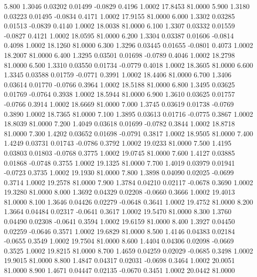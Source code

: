    5.800   1.3046   0.03202   0.01499  -0.0829   0.4196   1.0002  17.8453  81.0000
   5.900   1.3180   0.03223   0.01495  -0.0834   0.4171   1.0002  17.9155  81.0000
   6.000   1.3302   0.03285   0.01513  -0.0839   0.4140   1.0002  18.0038  81.0000
   6.100   1.3307   0.03332   0.01559  -0.0827   0.4121   1.0002  18.0595  81.0000
   6.200   1.3304   0.03387   0.01606  -0.0814   0.4098   1.0002  18.1260  81.0000
   6.300   1.3296   0.03445   0.01655  -0.0801   0.4073   1.0002  18.2007  81.0000
   6.400   1.3295   0.03501   0.01698  -0.0789   0.4046   1.0002  18.2798  81.0000
   6.500   1.3310   0.03550   0.01734  -0.0779   0.4018   1.0002  18.3605  81.0000
   6.600   1.3345   0.03588   0.01759  -0.0771   0.3991   1.0002  18.4406  81.0000
   6.700   1.3406   0.03614   0.01770  -0.0766   0.3964   1.0002  18.5188  81.0000
   6.800   1.3495   0.03625   0.01769  -0.0764   0.3938   1.0002  18.5944  81.0000
   6.900   1.3610   0.03625   0.01757  -0.0766   0.3914   1.0002  18.6669  81.0000
   7.000   1.3745   0.03619   0.01738  -0.0769   0.3890   1.0002  18.7365  81.0000
   7.100   1.3895   0.03613   0.01716  -0.0775   0.3867   1.0002  18.8039  81.0000
   7.200   1.4049   0.03618   0.01699  -0.0782   0.3844   1.0002  18.8718  81.0000
   7.300   1.4202   0.03652   0.01698  -0.0791   0.3817   1.0002  18.9505  81.0000
   7.400   1.4249   0.03731   0.01743  -0.0786   0.3792   1.0002  19.0233  81.0000
   7.500   1.4195   0.03803   0.01803  -0.0768   0.3775   1.0002  19.0745  81.0000
   7.600   1.4127   0.03885   0.01868  -0.0748   0.3755   1.0002  19.1325  81.0000
   7.700   1.4019   0.03979   0.01941  -0.0723   0.3735   1.0002  19.1930  81.0000
   7.800   1.3898   0.04090   0.02025  -0.0699   0.3714   1.0002  19.2578  81.0000
   7.900   1.3784   0.04210   0.02117  -0.0678   0.3690   1.0002  19.3280  81.0000
   8.000   1.3692   0.04329   0.02208  -0.0660   0.3666   1.0002  19.4013  81.0000
   8.100   1.3646   0.04426   0.02279  -0.0648   0.3641   1.0002  19.4752  81.0000
   8.200   1.3664   0.04484   0.02317  -0.0641   0.3617   1.0002  19.5470  81.0000
   8.300   1.3760   0.04490   0.02308  -0.0641   0.3594   1.0002  19.6159  81.0000
   8.400   1.3927   0.04450   0.02259  -0.0646   0.3571   1.0002  19.6829  81.0000
   8.500   1.4146   0.04383   0.02184  -0.0655   0.3549   1.0002  19.7504  81.0000
   8.600   1.4404   0.04306   0.02098  -0.0669   0.3525   1.0002  19.8215  81.0000
   8.700   1.4659   0.04259   0.02029  -0.0685   0.3498   1.0002  19.9015  81.0000
   8.800   1.4847   0.04317   0.02031  -0.0698   0.3464   1.0002  20.0051  81.0000
   8.900   1.4671   0.04447   0.02135  -0.0670   0.3451   1.0002  20.0442  81.0000
